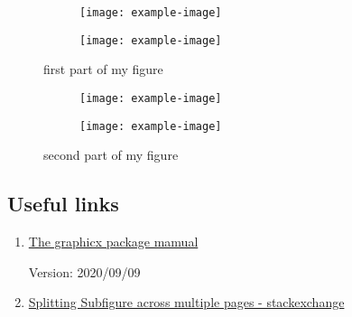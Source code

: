 \begin{figure}[b]
    \begin{subfigure}[t]{0.45\hsize}
        \texttt{[image: example-image]}
        \caption{}
    \end{subfigure}   
    \begin{subfigure}[t]{0.45\hsize}
        \texttt{[image: example-image]}
        \caption{}
    \end{subfigure}
    \caption{first part of my figure}
\end{figure}
\clearpage   
\begin{figure}[tb]\ContinuedFloat
    \begin{subfigure}[t]{0.45\hsize}
        \texttt{[image: example-image]}
        \caption{}
    \end{subfigure}
    \begin{subfigure}[t]{0.45\hsize}
        \texttt{[image: example-image]}
        \caption{}
    \end{subfigure}
    \caption{second part of my figure}
\end{figure}

\subsection{Useful links}

\begin{enumerate}

    \item \href{https://texdoc.org/serve/graphicx.pdf/0}{The graphicx package mamual}

    Version: 2020/09/09
    \item \href{https://tex.stackexchange.com/questions/298738/splitting-subfigure-across-multiple-pages}{Splitting Subfigure across multiple pages - stackexchange}
    
    
\end{enumerate}

